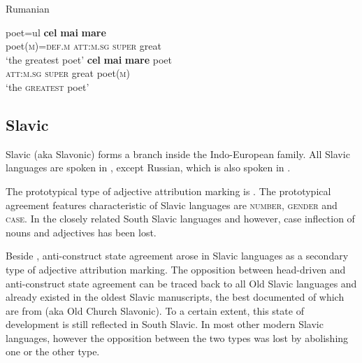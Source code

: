 \begin{exe}
\ex \rm{Rumanian \citep[93–94]{beyer-etal1987}}
\begin{xlist}
\ex
\label{rum def comp}%
\gll	poet=ul \textbf{cel} \textbf{mai} \textbf{mare}\\
	poet(\textsc{m})=\textsc{def.m} \textsc{att:m.sg} \textsc{super} great\\
\glt	‘the greatest poet’
\ex
\label{rum def sup}
\gll	\textbf{cel} \textbf{mai} \textbf{mare} poet\\
	\textsc{att:m.sg} \textsc{super} great poet(\textsc{m})\\
\glt	‘the \textsc{greatest} poet’
\end{xlist}
\end{exe}

\subsection{Slavic}
\label{slavic synchr}
Slavic (aka Slavonic) forms a branch inside the Indo-European family. All Slavic languages are spoken in , except Russian, which is also spoken in .

The prototypical type of adjective attribution marking is . The prototypical agreement features characteristic of Slavic languages are \textsc{number}, \textsc{gender} and \textsc{case}. In the closely related South Slavic languages  and  however, case inflection of nouns and adjectives has been lost.

Beside , anti\hyp{}construct state agreement arose in Slavic languages as a secondary type of adjective attribution marking. The opposition between head\hyp{}driven and anti\hyp{}construct state agreement can be traced back to all Old Slavic languages and already existed in the oldest Slavic manuscripts, the best documented of which are from  (aka Old Church Slavonic). To a certain extent, this state of development is still reflected in South Slavic. In most other modern Slavic languages, however the opposition between the two types was lost by abolishing one or the other type.

